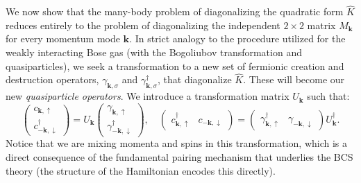 We now show that the many-body problem of diagonalizing the quadratic form \( \hat{K} \) reduces entirely to the problem of diagonalizing the independent \( 2 \times 2 \) matrix \( M_{\mathbf{k}} \) for every momentum mode \( \mathbf{k} \). In strict analogy to the procedure utilized for the weakly interacting Bose gas (with the Bogoliubov transformation and quasiparticles), we seek a transformation to a new set of fermionic creation and destruction operators, \( \gamma_{\mathbf{k},\sigma} \) and \( \gamma_{\mathbf{k},\sigma}^\dagger \), that diagonalize \( \hat{K} \). These will become our new \textit{quasiparticle operators}. We introduce a transformation matrix \( U_{\mathbf{k}} \) such that:
\begin{equation} \label{eq:bogoliubov_transform}
    \begin{pmatrix} c_{\mathbf{k},\uparrow} \\ c_{-\mathbf{k},\downarrow}^\dagger \end{pmatrix} = U_{\mathbf{k}} \begin{pmatrix} \gamma_{\mathbf{k},\uparrow} \\ \gamma_{-\mathbf{k},\downarrow}^\dagger \end{pmatrix}, \quad \begin{pmatrix} c_{\mathbf{k},\uparrow}^\dagger & c_{-\mathbf{k},\downarrow} \end{pmatrix} = \begin{pmatrix} \gamma_{\mathbf{k},\uparrow}^\dagger & \gamma_{-\mathbf{k},\downarrow} \end{pmatrix} U_{\mathbf{k}}^\dagger.
\end{equation}
Notice that we are mixing momenta and spins in this transformation, which is a direct consequence of the fundamental pairing mechanism that underlies the BCS theory (the structure of the Hamiltonian encodes this directly).

